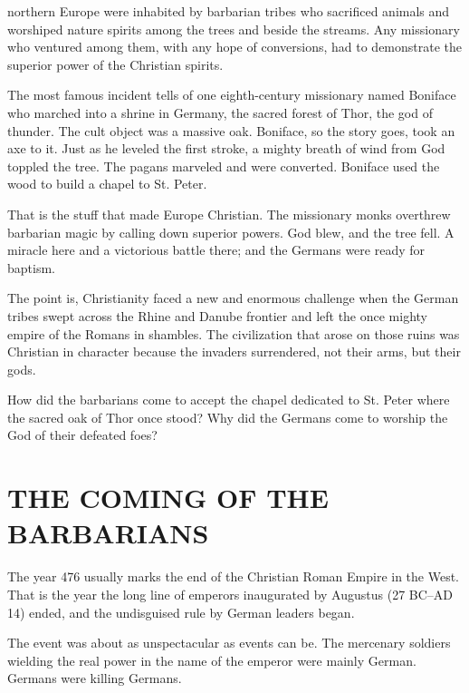 
 northern Europe were inhabited by barbarian tribes who
sacrificed animals and worshiped nature spirits among the trees and beside the streams. Any
missionary who ventured among them, with any hope of conversions, had to demonstrate the superior
power of the Christian spirits.

The most famous incident tells of one eighth-century missionary named Boniface who marched into a
shrine in Germany, the sacred forest of Thor, the god of thunder. The cult object was a massive oak.
Boniface, so the story goes, took an axe to it. Just as he leveled the first stroke, a mighty breath
of wind from God toppled the tree. The pagans marveled and were converted. Boniface used the wood to
build a chapel to St. Peter.

That is the stuff that made Europe Christian. The missionary monks overthrew barbarian magic by
calling down superior powers. God blew, and the tree fell. A miracle here and a victorious battle
there; and the Germans were ready for baptism.

The point is, Christianity faced a new and enormous challenge when the German tribes swept across
the Rhine and Danube frontier and left the once mighty empire of the Romans in shambles. The
civilization that arose on those ruins was Christian in character because the invaders surrendered,
not their arms, but their gods.

How did the barbarians come to accept the chapel dedicated to St. Peter where the sacred oak of Thor
once stood? Why did the Germans come to worship the God of their defeated foes?

\section{THE COMING OF THE BARBARIANS}

The year 476 usually marks the end of the Christian Roman Empire in the West. That is the year the
long line of emperors inaugurated by Augustus (27 BC–AD 14) ended, and the undisguised rule by
German leaders began.

The event was about as unspectacular as events can be. The mercenary soldiers wielding the real
power in the name of the emperor were mainly German. Germans were killing Germans.

